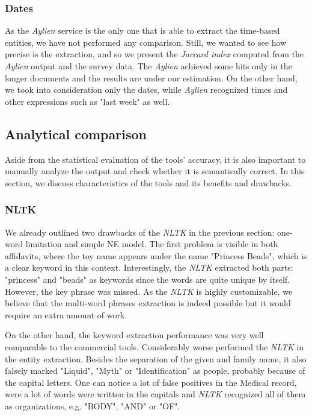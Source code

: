 \documentclass[
  digital, %
  table,   %
  lof,     %
  lot,     %
]{fithesis3}
\begin{document}
\subsubsection{\textbf{Dates}}
As the \textit{Aylien} service is the only one that is able to extract the time-based entities, we have not performed any comparison.
Still, we wanted to see how precise is the extraction, and so we present the \textit{Jaccard index} computed from the \textit{Aylien} output and the survey data.
The \textit{Aylien} achieved some hits only in the longer documents and the results are under our estimation.
On the other hand, we took into consideration only the dates, while \textit{Aylien} recognized times and other expressions such as "last week" as well.

\subsection{Analytical comparison}
Aside from the statistical evaluation of the tools' accuracy, it is also important to manually analyze the output and check whether it is semantically correct.
In this section, we discuss characteristics of the tools and its benefits and drawbacks.

\subsubsection{\textbf{NLTK}}
We already outlined two drawbacks of the \textit{NLTK} in the previous section: one-word limitation and simple NE model.
The first problem is visible in both affidavits, where the toy name appears under the name "Princess Beads", which is a clear keyword in this context.
Interestingly, the \textit{NLTK} extracted both parts: "princess" and "beads" as keywords since the words are quite unique by itself.
However, the key phrase was missed.
As the \textit{NLTK} is highly customizable, we believe that the multi-word phrases extraction is indeed possible but it would require an extra amount of work.

On the other hand, the keyword extraction performance was very well comparable to the commercial tools.
Considerably worse performed the \textit{NLTK} in the entity extraction.
Besides the separation of the given and family name, it also falsely marked "Liquid", "Myth" or "Identification" as people, probably because of the capital letters.
One can notice a lot of false positives in the Medical record, were a lot of words were written in the capitals and \textit{NLTK} recognized all of them as organizations, e.g. "BODY", "AND" or "OF".
\end{document}
